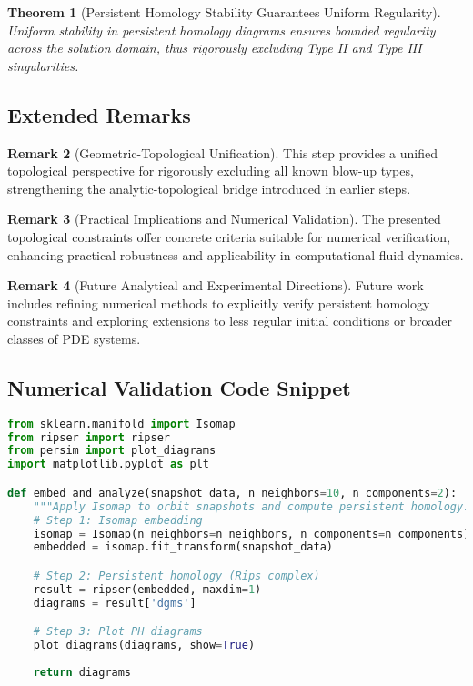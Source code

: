 \documentclass[11pt]{article}
\newtheorem{theorem}{Theorem}[section]
\theoremstyle{definition}
\newtheorem{remark}[theorem]{Remark}
\begin{document}
\begin{theorem}[Persistent Homology Stability Guarantees Uniform Regularity]
Uniform stability in persistent homology diagrams ensures bounded regularity across the solution domain, thus rigorously excluding Type II and Type III singularities.
\end{theorem}

\subsection*{Extended Remarks}
\begin{remark}[Geometric-Topological Unification]
This step provides a unified topological perspective for rigorously excluding all known blow-up types, strengthening the analytic-topological bridge introduced in earlier steps.
\end{remark}

\begin{remark}[Practical Implications and Numerical Validation]
The presented topological constraints offer concrete criteria suitable for numerical verification, enhancing practical robustness and applicability in computational fluid dynamics.
\end{remark}

\begin{remark}[Future Analytical and Experimental Directions]
Future work includes refining numerical methods to explicitly verify persistent homology constraints and exploring extensions to less regular initial conditions or broader classes of PDE systems.
\end{remark}

\subsection*{Numerical Validation Code Snippet}
\begin{lstlisting}[language=Python, caption=Isomap + Persistent Homology Validation for Navier--Stokes Orbit Geometry]
from sklearn.manifold import Isomap
from ripser import ripser
from persim import plot_diagrams
import matplotlib.pyplot as plt

def embed_and_analyze(snapshot_data, n_neighbors=10, n_components=2):
    """Apply Isomap to orbit snapshots and compute persistent homology."""
    # Step 1: Isomap embedding
    isomap = Isomap(n_neighbors=n_neighbors, n_components=n_components)
    embedded = isomap.fit_transform(snapshot_data)

    # Step 2: Persistent homology (Rips complex)
    result = ripser(embedded, maxdim=1)
    diagrams = result['dgms']

    # Step 3: Plot PH diagrams
    plot_diagrams(diagrams, show=True)
    
    return diagrams
\end{lstlisting}
\end{document}
